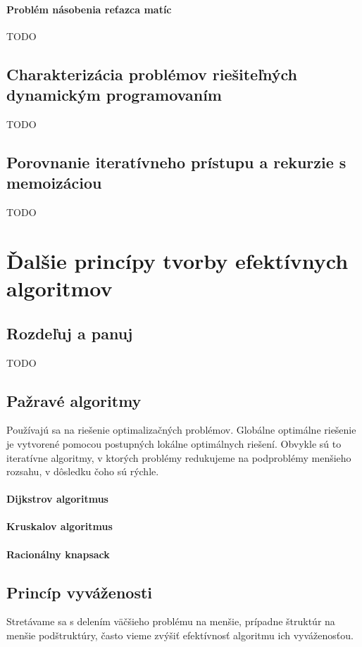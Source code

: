 		\paragraph{Problém násobenia reťazca matíc} TODO

	\subsection{Charakterizácia problémov riešiteľných dynamickým programovaním} TODO
	
	\subsection{Porovnanie iteratívneho prístupu a rekurzie s memoizáciou} TODO


\section{Ďalšie princípy tvorby efektívnych algoritmov}
	\subsection{Rozdeľuj a panuj}
	TODO
	\subsection{Pažravé algoritmy}
		Používajú sa na riešenie optimalizačných problémov. Globálne optimálne riešenie je vytvorené pomocou postupných lokálne optimálnych riešení. Obvykle sú to iteratívne algoritmy, v ktorých problémy redukujeme na podproblémy menšieho rozsahu, v dôsledku čoho sú rýchle.
		\paragraph{Dijkstrov algoritmus}
		\paragraph{Kruskalov algoritmus}
		\paragraph{Racionálny knapsack}
	\subsection{Princíp vyváženosti}
		Stretávame sa s delením väčšieho problému na menšie, prípadne štruktúr na menšie podštruktúry, často vieme zvýšiť efektívnosť algoritmu ich vyváženosťou.
